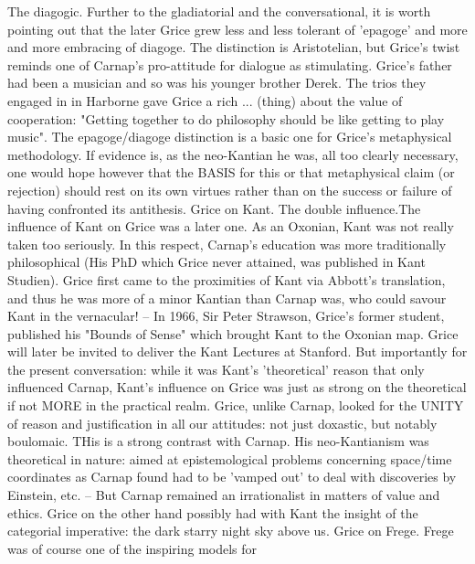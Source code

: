 \documentclass[10pt,titlepage]{book}
\begin{document}
{The  diagogic. Further to the gladiatorial and the 
conversational, it is  worth  pointing out that the later Grice grew less and less 
tolerant of 'epagoge'   and more and more embracing of diagoge. The distinction is 
Aristotelian,  but  Grice's twist reminds one of Carnap's pro-attitude for 
dialogue  as   stimulating. Grice's  father had been a musician and so was 
his younger brother Derek.  The trios  they engaged in in Harborne gave Grice 
a rich ... (thing) about the value of  cooperation: "Getting together to do 
philosophy should be like getting  to  play music". The epagoge/diagoge 
distinction is a basic one for Grice's  metaphysical  methodology. If evidence 
is, as the neo-Kantian he was, all  too clearly  
necessary, one would hope however that the BASIS for this  or that 
metaphysical  claim (or rejection) should rest on its own virtues  rather than on 
the success  or failure of having confronted its  antithesis. 
Grice  on Kant. The  double influence.The influence of Kant on Grice was a 
later one. As an Oxonian,  Kant was not really taken too seriously. In this 
respect, Carnap's education was  more traditionally philosophical (His PhD 
which Grice never attained, was  published in Kant Studien). Grice first came 
to the proximities of Kant via  Abbott's translation, and thus he was more 
of a minor Kantian than Carnap was,  who could savour Kant in the 
vernacular! -- In 1966, Sir Peter Strawson, Grice's  former student, published his 
"Bounds of Sense" which brought Kant to the  Oxonian map. Grice will later be 
invited to deliver the Kant Lectures at  Stanford. But  importantly for the 
present conversation: while it was Kant's 'theoretical'  reason that only 
influenced Carnap, Kant's influence on Grice was just as strong  on the 
theoretical if not MORE in the practical realm. Grice, unlike  Carnap, looked for 
the UNITY of reason and justification in all  our attitudes: not just 
doxastic, but notably boulomaic. THis is a strong  contrast with Carnap. His 
neo-Kantianism was theoretical in nature: aimed at  epistemological problems 
concerning space/time coordinates as Carnap  found had to be 'vamped out' to deal 
with discoveries by Einstein, etc.  -- But Carnap remained an irrationalist 
in matters of value and  ethics. Grice on the other hand possibly had with 
Kant the insight of the  categorial imperative: the dark starry night sky 
above us. 
Grice  on Frege. Frege was of course one of the inspiring models for 
}
\end{document}
